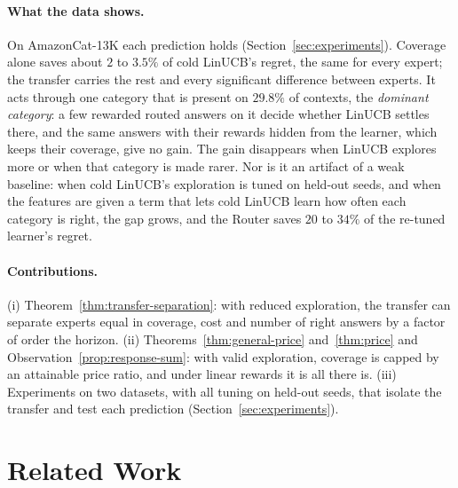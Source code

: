 \documentclass[anon]{alt2027} %
\begin{document}
\paragraph{What the data shows.}
On AmazonCat-13K each prediction holds (Section~\ref{sec:experiments}).
Coverage alone saves about $2$ to $3.5\%$ of cold LinUCB's regret, the same
for every expert; the transfer carries the rest and every significant
difference between experts. It acts through one category that is present on
$29.8\%$ of contexts, the \emph{dominant category}: a few rewarded routed
answers on it decide whether LinUCB settles there, and the same answers with
their rewards hidden from the learner, which keeps their coverage, give no
gain. The gain disappears when LinUCB explores more or when that category is
made rarer. Nor is it an artifact of a weak baseline: when cold LinUCB's
exploration is tuned on held-out seeds, and when the features are given a
term that lets cold LinUCB learn how often each category is right, the gap
grows, and the Router saves $20$ to $34\%$ of the re-tuned learner's regret.

\paragraph{Contributions.}
(i) Theorem~\ref{thm:transfer-separation}: with reduced exploration, the
transfer can separate experts equal in coverage, cost and number of right
answers by a factor of order the horizon. (ii) Theorems~\ref{thm:general-price}
and~\ref{thm:price} and Observation~\ref{prop:response-sum}: with valid
exploration, coverage is capped by an attainable price ratio, and under
linear rewards it is all there is. (iii) Experiments on two datasets, with
all tuning on held-out seeds, that isolate the transfer and test each
prediction (Section~\ref{sec:experiments}).

\section{Related Work}
\label{sec:related-main}
\end{document}
